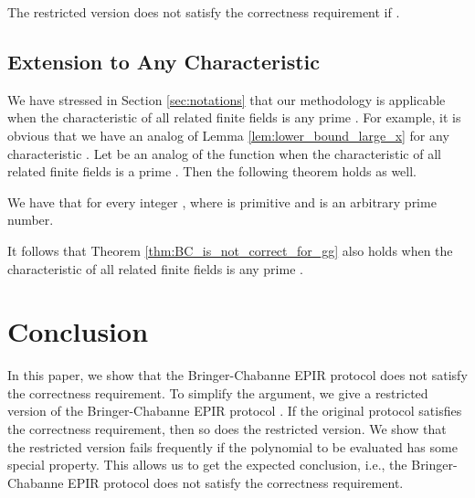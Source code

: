 \documentclass[JMC]{degruyter-journal}
\begin{document}
\begin{theorem}\label{thm:BC_is_not_correct_for_gg}
The restricted version  does not satisfy the correctness requirement if .
\end{theorem}


\subsection{Extension to Any Characteristic }
We have stressed in Section \ref{sec:notations} that our methodology
is applicable when the characteristic of all related finite fields
is any prime . For example, it is obvious that
we have an analog of Lemma \ref{lem:lower_bound_large_x} for any
characteristic .
Let  be an analog of the
function  when the characteristic of all related finite
fields is a prime .
Then the following theorem holds as
well.
\begin{theorem}\label{thm:lower_bound_eta_for_any_n_p}

We have that  for every integer
, where  is primitive and  is an
arbitrary prime number.
\end{theorem}
It follows that Theorem \ref{thm:BC_is_not_correct_for_gg} also
holds when the  characteristic of all related finite fields is any
prime  .

\section{Conclusion}

In this paper, we  show that the Bringer-Chabanne EPIR protocol does not satisfy the correctness requirement.
 To simplify the argument, we give a restricted version of  the Bringer-Chabanne EPIR protocol   . If the original protocol satisfies the correctness requirement, then so does the restricted version.
We  show that the restricted version fails frequently   if the
polynomial to be evaluated has some special property. This allows us
to get the expected conclusion, i.e., the Bringer-Chabanne EPIR
protocol    does not satisfy the correctness requirement.
\end{document}
